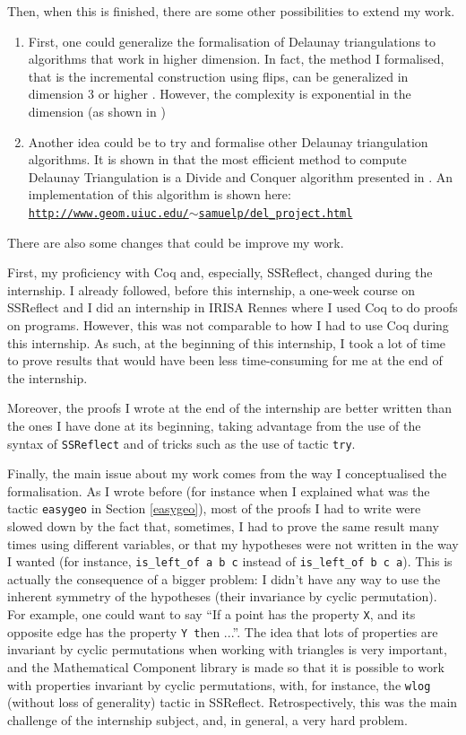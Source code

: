 \documentclass[a4paper,10pt]{article}
\def\ttt#1#2{{\tt{\color{black}#1} #2}}
\begin{document}
Then, when this is finished, there are some other possibilities to extend my work.
\begin{enumerate}
\item First, one could generalize the formalisation of Delaunay triangulations to algorithms that work in higher dimension. In fact, the method I formalised, that is the incremental construction using flips, can be generalized in dimension 3 or higher \cite{CompGeoAlgo}. However, the complexity is exponential in the dimension (as shown in \cite{IncrementalDimension})
\item Another idea could be to try and formalise other Delaunay triangulation algorithms. It is shown in \cite{Comparison} that the most efficient method to compute Delaunay Triangulation is a Divide and Conquer algorithm presented in \cite{AlgoDivide}. An implementation of this algorithm is shown here:\\
  \href{http://www.geom.uiuc.edu/~samuelp/del_project.html}{{\tt http://www.geom.uiuc.edu/$\sim$samuelp/del\_project.html}}
\end{enumerate}

There are also some changes that could be improve my work.

First, my proficiency with {\sc Coq} and, especially, {\sc SSReflect}, changed during the internship. I already followed, before this internship, a one-week course on {\sc SSReflect} and I did an internship in IRISA Rennes where I used {\sc Coq} to do proofs on programs. However, this was not comparable to how I had to use {\sc Coq} during this internship. As such, at the beginning of this internship, I took a lot of time to prove results that would have been less time-consuming for me at the end of the internship.

Moreover, the proofs I wrote at the end of the internship are better written than the ones I have done at its beginning, taking advantage from the use of the syntax of {\tt SSReflect} and of tricks such as the use of tactic {\tt try}.

\label{symmetry}
Finally, the main issue about my work comes from the way I conceptualised  the formalisation. As I wrote before (for instance when I explained what was the tactic {\tt easygeo} in Section \ref{easygeo}), most of the proofs I had to write were slowed down by the fact that, sometimes, I had to prove the same result many times using different variables, or that my hypotheses were not written in the way I wanted (for instance, {\tt is\_left\_of a b c} instead of {\tt is\_left\_of b c a}). This is actually the consequence of a bigger problem: I didn't have any way to use the inherent symmetry of the hypotheses (their invariance by cyclic permutation).
For example, one could want to say ``If a point has the property {\tt X}, and its opposite edge has the property \ttt{Y} then ...''. The idea that lots of properties are invariant by cyclic permutations when working with triangles is very important, and the {\sc Mathematical Component} library is made so that it is possible to work with properties invariant by cyclic permutations, with, for instance, the {\tt wlog} (without loss of generality) tactic in {\sc SSReflect}.
Retrospectively, this was the main challenge of the internship subject, and, in general, a very hard problem. 
\end{document}
